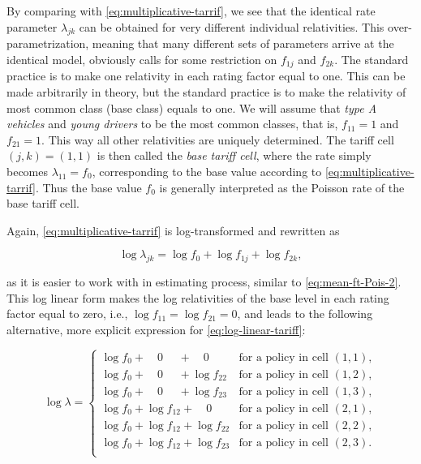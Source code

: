 \documentclass[]{book}
\theoremstyle{definition}
\theoremstyle{definition}
\theoremstyle{definition}
\theoremstyle{remark}
\begin{document}
By comparing with \eqref{eq:multiplicative-tarrif}, we see that the
identical rate parameter \(\lambda_{jk}\) can be obtained for very
different individual relativities. This over-parametrization, meaning
that many different sets of parameters arrive at the identical model,
obviously calls for some restriction on \(f_{1j}\) and \(f_{2k}\). The
standard practice is to make one relativity in each rating factor equal
to one. This can be made arbitrarily in theory, but the standard
practice is to make the relativity of most common class (base class)
equals to one. We will assume that \emph{type A vehicles} and
\emph{young drivers} to be the most common classes, that is,
\(f_{11} = 1\) and \(f_{21} = 1\). This way all other relativities are
uniquely determined. The tariff cell \((j,k)=(1,1)\) is then called the
\emph{base tariff cell}, where the rate simply becomes
\(\lambda_{11}=f_0\), corresponding to the base value according to
\eqref{eq:multiplicative-tarrif}. Thus the base value \(f_0\) is generally
interpreted as the Poisson rate of the base tariff cell.

Again, \eqref{eq:multiplicative-tarrif} is log-transformed and rewritten
as

\begin{equation}
\log \lambda_{jk}= \log f_0 + \log f_{1j} + \log f_{2k},
\label{eq:log-linear-tariff}
\end{equation}

as it is easier to work with in estimating process, similar to
\eqref{eq:mean-ft-Pois-2}. This log linear form makes the log relativities
of the base level in each rating factor equal to zero, i.e.,
\(\log f_{11}=\log f_{21}=0\), and leads to the following alternative,
more explicit expression for \eqref{eq:log-linear-tariff}:

\begin{equation}
\log \lambda=\begin{cases}
      \log f_0 + \quad 0 \quad \,\,+ \quad 0 \quad \,\,& \text{for a policy in cell $(1,1)$}, \\
            \log f_0+ \quad 0 \quad \,\,+\log f_{22}& \text{for a policy in cell $(1,2)$}, \\
                  \log f_0+ \quad 0 \quad \,\,+\log f_{23}& \text{for a policy in cell $(1,3)$}, \\
                        \log f_0+\log f_{12}+ \quad 0 \quad \,\,& \text{for a policy in cell $(2,1)$}, \\
                              \log f_0+\log f_{12}+\log f_{22}& \text{for a policy in cell $(2,2)$}, \\
                                    \log f_0+\log f_{12}+\log f_{23}& \text{for a policy in cell $(2,3)$}. \\
\end{cases}
\label{eq:log-rate-Poi-tariff-3}
\end{equation}
\end{document}

